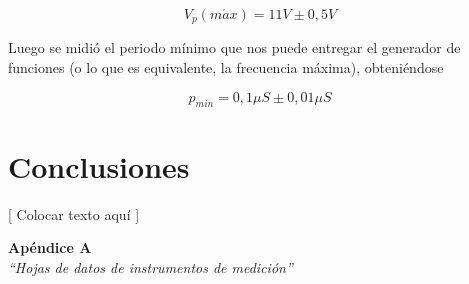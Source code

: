 \documentclass{article}
\begin{document}
\begin{equation*}
	V_p(m\acute{a}x) = 11V \pm 0,5V
\end{equation*}
\medskip
	
	Luego se midió el periodo mínimo que nos puede entregar el generador de funciones (o lo que es equivalente, la frecuencia máxima), obteniéndose

\begin{equation*}
	p_{min} = 0,1\mu S \pm 0,01\mu S
\end{equation*}


\bigskip\bigskip




\section{Conclusiones}

	[ Colocar texto aquí ]
	\bigskip\bigskip





\newpage
\vspace*{4cm}
\begin{center}
	\textbf{\Huge{Apéndice A}} \\
	\bigskip\bigskip
	\Large{\textit{``Hojas de datos de instrumentos de medición''}}
\end{center}
\end{document}
